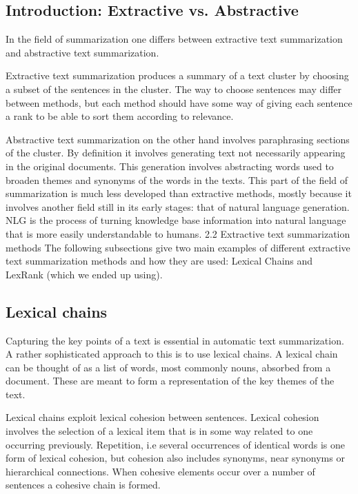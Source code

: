 \documentclass[10pt, a4paper]{article}
\begin{document}
\subsection{Introduction: Extractive vs. Abstractive}
In the field of summarization one differs between extractive text summarization and abstractive text summarization. 

Extractive text summarization produces a summary of a text cluster by choosing a subset of the sentences in the cluster. The way to choose sentences may differ between methods, but each method should have some way of giving each sentence a rank to be able to sort them according to relevance.  

Abstractive text summarization on the other hand involves paraphrasing sections of the cluster. By definition it involves generating text not necessarily appearing in the original documents. This generation involves abstracting words used to broaden themes and synonyms of the words in the texts. This part of the field of summarization is much less developed than extractive methods, mostly because it involves another field still in its early stages: that of natural language generation. NLG is the process of turning knowledge base information into natural language that is more easily understandable to humans.
2.2 Extractive text summarization methods
The following subsections give two main examples of different extractive text summarization methods and how they are used: Lexical Chains and LexRank (which we ended up using).

\subsection{Lexical chains}

Capturing the key points of a text is essential in automatic text summarization. A rather sophisticated approach to this is to use lexical chains. A lexical chain can be thought of as a list of words, most commonly nouns, absorbed from a document. These are meant to form a representation of the key themes of the text.

Lexical chains exploit lexical cohesion between sentences. Lexical cohesion involves the selection of a lexical item that is in some way related to one occurring previously. Repetition, i.e several occurrences of identical words is one form of lexical cohesion, but cohesion also includes synonyms, near synonyms or hierarchical connections. When cohesive elements occur over a number of sentences a cohesive chain is formed.
\end{document}
